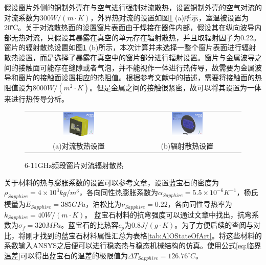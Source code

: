 \documentclass[master]{thesis-uestc}
\begin{document}
假设窗片外侧的铜制外壳在与空气进行强制对流散热，设置铜制外壳的空气对流的对流系数为\(300 W/ (m \cdot K)\)，外界热对流的设置如图\ref{fig:X频段窗片对流辐射散热} (a)所示，室温被设置为20℃。关于对流散热面的设置窗片表面由于焊接在器件内部，假设其在纵向波导内部无热对流，只假设其暴露在真空的单元存在辐射散热，并且取辐射因子为0.22。
窗片的辐射散热设置如图\ref{fig:X频段窗片对流辐射散热} (b)所示，本次计算并未选择一整个窗片表面进行辐射散热设置，而是选择了暴露在真空中的窗片部分进行辐射设置。窗片与金属波导之间的接触面可能存在缝隙或者气泡，并不能视作一体进行热传导，故需要为金属波导和窗片的接触面设置相应的热阻值。根据参考文献\cite{jiang_2022_design}中的描述，需要将接触面的热阻值设为8000\(W / (m^2 \cdot K)\)。但是金属之间的接触很紧密，故可以将其设置为一体来进行热传导分析。
\begin{figure}[!htb]
    \small
    \centering
    \begin{tabular}{@{\ }c@{\ }c}
        \includegraphics[width=0.3\textwidth]{pic/chapter3/窗片对流系数.png} & 
        \hspace{5pt}
        \includegraphics[width=0.3\textwidth]{pic/chapter3/辐射单元选择.png}     \\
        \mbox{\small (a)对流散热设置}                                                                               & 
        \mbox{\small (b)辐射散热设置}                                                                                  \\
    \end{tabular}
    \caption{6-11GHz频段窗片对流辐射散热}
    \label{fig:X频段窗片对流辐射散热}
\end{figure}

关于材料的热与膨胀系数的设置可以参考文章\cite{thumm_stateart_2020}，设置蓝宝石的密度为\( \rho_{Sapphire}= 4 \times 10^3 kg/ m^3\)，各向同性热膨胀系数为\(\alpha_{Sapphire} = 5.5 \times 10 ^{-6}K^{-1}\)，杨氏模量为\( E_{Sapphire}= 385 GPa \)，泊松比为\( \nu_{Sapphire}= 0.22 \)，各向同性导热率为\(k_{Sapphire} =40 W/(m \cdot K)\)。
蓝宝石材料的抗弯强度可以通过文章\cite{hanyong_diff_2011}中找出，抗弯系数为\(\sigma_{f} = 320MPa\)。蓝宝石的比热容\(c_p\)为\(0.8 J/ (g \cdot K)\)。为了方便后续的查阅与对比，将刚才找到的蓝宝石材料属性汇总为表格\ref{tab:AlOStateOfArt}。将这些材料的系数输入ANSYS之后便可以进行稳态热与稳态机械结构的仿真。使用公式\ref{eq:临界温差}可以得出蓝宝石的温差的极限值为\(\Delta T_{Sapphire} = 126.76 ^\circ C\)。
\end{document}
